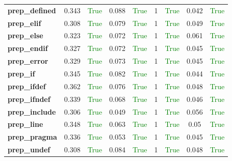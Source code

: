 \documentclass{article}
\begin{document}
\begin{xltabular}{\textwidth}{lcccccccc}
\textbf{{\fontsize{10}{12}\selectfont prep\_defined}}& 0.343&\textcolor{green}{True}& 0.088&\textcolor{green}{True}& 1&\textcolor{green}{True}& 0.042&\textcolor{green}{True} \\[0.5ex]
\textbf{{\fontsize{10}{12}\selectfont prep\_elif}}& 0.308&\textcolor{green}{True}& 0.079&\textcolor{green}{True}& 1&\textcolor{green}{True}& 0.049&\textcolor{green}{True} \\[0.5ex]
\textbf{{\fontsize{10}{12}\selectfont prep\_else}}& 0.323&\textcolor{green}{True}& 0.072&\textcolor{green}{True}& 1&\textcolor{green}{True}& 0.061&\textcolor{green}{True} \\[0.5ex]
\textbf{{\fontsize{10}{12}\selectfont prep\_endif}}& 0.327&\textcolor{green}{True}& 0.072&\textcolor{green}{True}& 1&\textcolor{green}{True}& 0.045&\textcolor{green}{True} \\[0.5ex]
\textbf{{\fontsize{10}{12}\selectfont prep\_error}}& 0.329&\textcolor{green}{True}& 0.073&\textcolor{green}{True}& 1&\textcolor{green}{True}& 0.045&\textcolor{green}{True} \\[0.5ex]
\textbf{{\fontsize{10}{12}\selectfont prep\_if}}& 0.345&\textcolor{green}{True}& 0.082&\textcolor{green}{True}& 1&\textcolor{green}{True}& 0.044&\textcolor{green}{True} \\[0.5ex]
\textbf{{\fontsize{10}{12}\selectfont prep\_ifdef}}& 0.362&\textcolor{green}{True}& 0.076&\textcolor{green}{True}& 1&\textcolor{green}{True}& 0.048&\textcolor{green}{True} \\[0.5ex]
\textbf{{\fontsize{10}{12}\selectfont prep\_ifndef}}& 0.339&\textcolor{green}{True}& 0.068&\textcolor{green}{True}& 1&\textcolor{green}{True}& 0.046&\textcolor{green}{True} \\[0.5ex]
\textbf{{\fontsize{10}{12}\selectfont prep\_include}}& 0.306&\textcolor{green}{True}& 0.049&\textcolor{green}{True}& 1&\textcolor{green}{True}& 0.056&\textcolor{green}{True} \\[0.5ex]
\textbf{{\fontsize{10}{12}\selectfont prep\_line}}& 0.348&\textcolor{green}{True}& 0.063&\textcolor{green}{True}& 1&\textcolor{green}{True}& 0.05&\textcolor{green}{True} \\[0.5ex]
\textbf{{\fontsize{10}{12}\selectfont prep\_pragma}}& 0.336&\textcolor{green}{True}& 0.053&\textcolor{green}{True}& 1&\textcolor{green}{True}& 0.045&\textcolor{green}{True} \\[0.5ex]
\textbf{{\fontsize{10}{12}\selectfont prep\_undef}}& 0.308&\textcolor{green}{True}& 0.084&\textcolor{green}{True}& 1&\textcolor{green}{True}& 0.048&\textcolor{green}{True} \\[0.5ex]

\end{xltabular}
\end{document}

